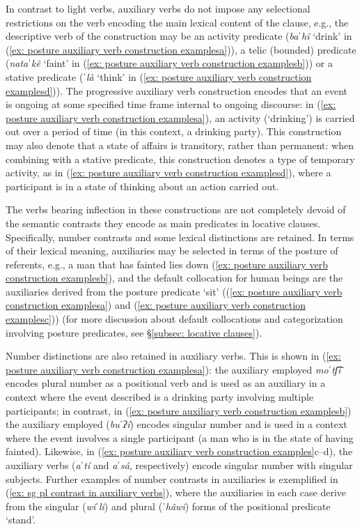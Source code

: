     \z
\z

In contrast to light verbs, auxiliary verbs do not impose any selectional restrictions on the verb encoding the main lexical content of the clause, e.g., the descriptive verb of the construction may be an activity predicate (\textit{baˈhî} `drink' in (\ref{ex: posture auxiliary verb construction examplesa})), a telic (bounded) predicate (\textit{nataˈkê} `faint' in (\ref{ex: posture auxiliary verb construction examplesb})) or a stative predicate (\textit{ˈlà} `think' in (\ref{ex: posture auxiliary verb construction examplesd})). The progressive auxiliary verb construction encodes that an event is ongoing at some specified time frame internal to ongoing discourse: in (\ref{ex: posture auxiliary verb construction examplesa}), an activity (`drinking') is carried out over a period of time (in this context, a drinking party). This construction may also denote that a state of affairs is transitory, rather than permanent: when combining with a stative predicate, this construction denotes a type of temporary activity, as in (\ref{ex: posture auxiliary verb construction examplesd}), where a participant is in a state of thinking about an action carried out.

The verbs bearing inflection in these constructions are not completely devoid of the semantic contrasts they encode as main predicates in locative clauses. Specifically, number contrasts and some lexical distinctions are retained. In terms of their lexical meaning, auxiliaries may be selected in terms of the posture of referents, e.g., a man that has fainted lies down (\ref{ex: posture auxiliary verb construction examplesb}), and the default collocation for human beings are the auxiliaries derived from the posture predicate `sit' ((\ref{ex: posture auxiliary verb construction examplesa}) and (\ref{ex: posture auxiliary verb construction examplesc})) (for more discussion about default collocations and categorization involving posture predicates, see §\ref{subsec: locative clauses}).

Number distinctions are also retained in auxiliary verbs. This is shown in (\ref{ex: posture auxiliary verb construction examplesa}): the auxiliary employed \textit{moˈtʃ͡í} encodes plural number as a positional verb and is used as an auxiliary in a context where the event described is a drinking party involving multiple participants; in contrast, in (\ref{ex: posture auxiliary verb construction examplesb}) the auxiliary employed (\textit{buˈʔí}) encodes singular number and is used in a context where the event involves a single participant (a man who is in the state of having fainted). Likewise, in (\ref{ex: posture auxiliary verb construction examples}c--d), the auxiliary verbs (\textit{aˈtí} and \textit{aˈsá}, respectively) encode singular number with singular subjects. Further examples of number contrasts in auxiliaries is exemplified in (\ref{ex: sg pl contrast in auxiliary verbs}), where the auxiliaries in each case derive from the singular (\textit{wiˈli}) and plural (\textit{ˈhâwi}) forms of the positional predicate `stand'.

